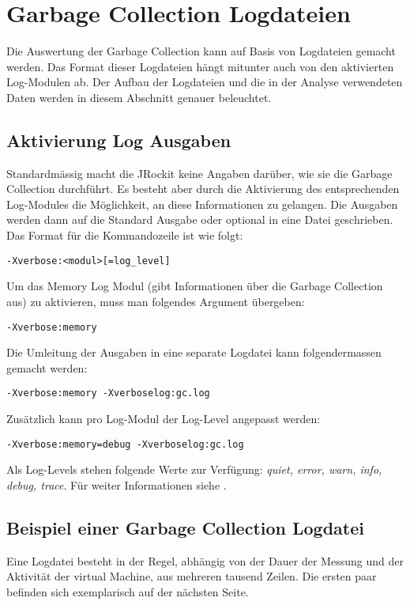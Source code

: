 \section{Garbage Collection Logdateien}\label{jrockitgclog}
Die Auswertung der Garbage Collection kann auf Basis von Logdateien gemacht werden. Das Format dieser Logdateien hängt mitunter auch von den aktivierten Log-Modulen ab. Der Aufbau der Logdateien und die in der Analyse verwendeten Daten werden in diesem Abschnitt genauer beleuchtet.

\subsection{Aktivierung Log Ausgaben}
Standardmässig macht die JRockit keine Angaben darüber, wie sie die Garbage Collection durchführt. Es besteht aber durch die Aktivierung des entsprechenden Log-Modules die Möglichkeit, an diese Informationen zu gelangen. Die Ausgaben werden dann auf die Standard Ausgabe oder optional in eine Datei geschrieben. Das Format für die Kommandozeile ist wie folgt:

\begin{lstlisting}[caption=Format Aktivierung Log Modul]
-Xverbose:<modul>[=log_level]
\end{lstlisting}

Um das Memory Log Modul (gibt Informationen über die Garbage Collection aus) zu aktivieren, muss man folgendes Argument übergeben:
\begin{lstlisting}[caption=Garbage Collection Log (Info)]
-Xverbose:memory
\end{lstlisting}

Die Umleitung der Ausgaben in eine separate Logdatei kann folgendermassen gemacht werden:
\begin{lstlisting}[caption=Garbage Collection Log (Info) - Umleitung in gc.log]
-Xverbose:memory -Xverboselog:gc.log 
\end{lstlisting}


Zusätzlich kann pro Log-Modul der Log-Level angepasst werden:
\begin{lstlisting}[caption=Einstellung des Log-Levels]
-Xverbose:memory=debug -Xverboselog:gc.log 
\end{lstlisting}
Als Log-Levels stehen folgende Werte zur Verfügung: \textit{quiet, error, warn, info, debug, trace}. Für weiter Informationen siehe \cite{oracleJRockitR28CLR}.

\subsection{Beispiel einer Garbage Collection Logdatei}
Eine Logdatei besteht in der Regel, abhängig von der Dauer der Messung und der Aktivität der virtual Machine, aus mehreren tausend Zeilen. Die ersten paar befinden sich exemplarisch auf der nächsten Seite.

